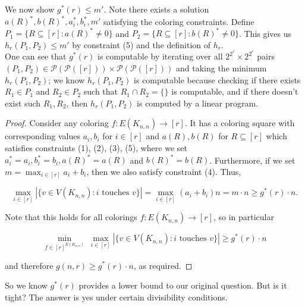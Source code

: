 \documentclass{article}
\begin{document}
We now show $g^*(r) \leq m'$. Note there exists a solution $a(R)^*,b(R)^*,a_i^*,b_i^*,m'$ satisfying the coloring constraints. Define $P_1 = \{R \subseteq [r] : a(R)^* \neq 0\}$ and $P_2 = \{R \subseteq [r] : b(R)^* \neq 0 \}$. This gives us $h_r(P_1,P_2) \leq m'$ by constraint (5) and the definition of $h_r$.  \\

One can see that $g^*(r)$ is computable by iterating over all $2^{2^r} \times 2^{2^r}$ pairs $(P_1,P_2) \in  \mathcal{P}(\mathcal{P}([r])) \times \mathcal{P}(\mathcal{P}([r]))$ and taking the minimum $h_r(P_1,P_2)$; we know $h_r(P_1,P_2)$ is computable because checking if there exists $R_1 \in P_1$ and $R_2 \in P_2$ such that $R_1 \cap R_2 = \{\}$ is computable, and if there doesn't exist such $R_1,R_2$, then $h_r(P_1,P_2)$ is computed by a linear program. \\


\computelower*

\begin{proof}
Consider any coloring $f : E(K_{n,n}) \rightarrow [r]$. It has a coloring square with corresponding values $a_i,b_i$ for $i \in [r]$ and $a(R),b(R)$ for $R \subseteq [r]$ which satisfies constraints (1), (2), (3), (5), where we set $a_i^* = a_i, b_i^* = b_i, a(R)^* = a(R)$ and $b(R)^* = b(R)$. Furthermore, if we set $m = \max_{i \in [r]} a_i + b_i$, then we also satisfy constraint (4). Thus, 

$$\max_{i \in [r]} |\{v \in V(K_{n,n}) : i \text{ touches } v\}| = \max_{i \in [r]} (a_i + b_i)n = m \cdot n \geq g^*(r) \cdot n.$$

\noindent
Note that this holds for all colorings $f : E(K_{n,n}) \rightarrow [r]$, so in particular

$$\min_{f \in [r]^{E(K_{n,n})}} \ \max_{i \in [r]} |\{v \in V(K_{n,n}) : i \text{ touches } v \}| \geq g^*(r) \cdot n$$

\noindent
and therefore $g(n,r) \geq g^*(r) \cdot n$, as required. 
\end{proof}

So we know $g^*(r)$ provides a lower bound to our original question. But is it tight? The answer is yes under certain divisibility conditions. \\

\compute*
\end{document}
